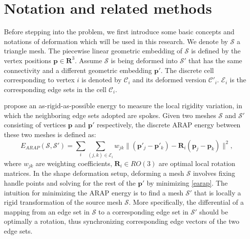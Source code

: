 \section{Notation and related methods}
Before stepping into the problem, we first introduce some basic concepts and notations of deformation which will be used in this research. We denote by $\mathcal S$ a triangle mesh. The piecewise linear geometric embedding of $\mathcal S$ is defined by the vertex positions $ \mathbf{p} \in \mathbf R^3$. Assume $\mathcal S$ is being deformed into $\mathcal S'$ that has the same connectivity and a different geometric embedding $\mathbf{p'}$. The discrete cell corresponding to vertex $i$ is denoted by $\mathcal  C_i$ and its deformed version $\mathcal  C'_i$. $\mathcal{E}_i$ is the corresponding edge sets in the cell $\mathcal  C_i$.

\cite{sorkine2007rigid} propose an as-rigid-as-possible energy to measure the local rigidity variation, in which the neighboring edge sets adopted are spokes. Given two meshes $\mathcal S$ and $\mathcal S'$ consisting of vertices $\mathbf{p}$ and $\mathbf{p'}$ respectively, the discrete ARAP energy between these two meshes is defined as:
\begin{equation}\label{earap}
E_{ARAP}(\mathcal S, \mathcal S')=\displaystyle \sum_i\!\!\sum_{(j,k)\in\mathcal{E}_i}\!\!\!w_{jk}\|(\mathbf p'_j - \mathbf p'_k)\!-\!\mathbf R_i(\mathbf p_j - \mathbf p_k)\|^2,
\end{equation}
where $w_{jk}$ are weighting coefficients, $\mathbf R_i \in RO(3)$ are optimal local rotation matrices. In the shape deformation setup, deforming a mesh $\mathcal S$ involves fixing handle points and solving for the rest of the $\mathbf{p'}$ by minimizing \eqref{earap}. The intuition for minimizing the ARAP energy is to find a mesh $\mathcal S'$ that is locally a rigid transformation of the source mesh $\mathcal S$. More specifically, the differential of a mapping from an edge set in $\mathcal S$ to a corresponding edge set in $\mathcal S'$ should be optimally a rotation, thus synchronizing corresponding edge vectors of the two edge sets.

